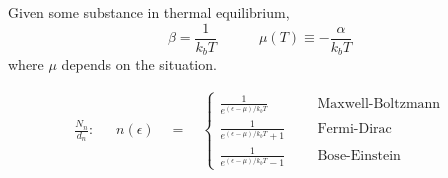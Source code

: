 \documentclass[12pt]{article}
\begin{document}
\newpage
Given some substance in thermal equilibrium,
\[\beta = \frac{1}{k_b T} \hspace{18pt} \hspace{18pt} \mu(T) \equiv - \frac{\alpha}{k_b T}\]
where \(\mu\) depends on the situation.

\[\begin{aligned}
    \tfrac{N_n}{d_n}: \hspace{18pt} n(\epsilon) \quad = \quad \begin{cases} 
        \frac{1}{ e^{ (\epsilon - \mu) / k_b T } }       & \hspace{18pt} \text{Maxwell-Boltzmann}\\[10pt]
        \frac{1}{ e^{ (\epsilon - \mu) / k_b T } + 1}    & \hspace{18pt} \text{Fermi-Dirac} \\[10pt]
        \frac{1}{ e^{ (\epsilon - \mu) / k_b T } - 1}    & \hspace{18pt} \text{Bose-Einstein}
    \end{cases}
\end{aligned}\]

\newpage
\end{document}
